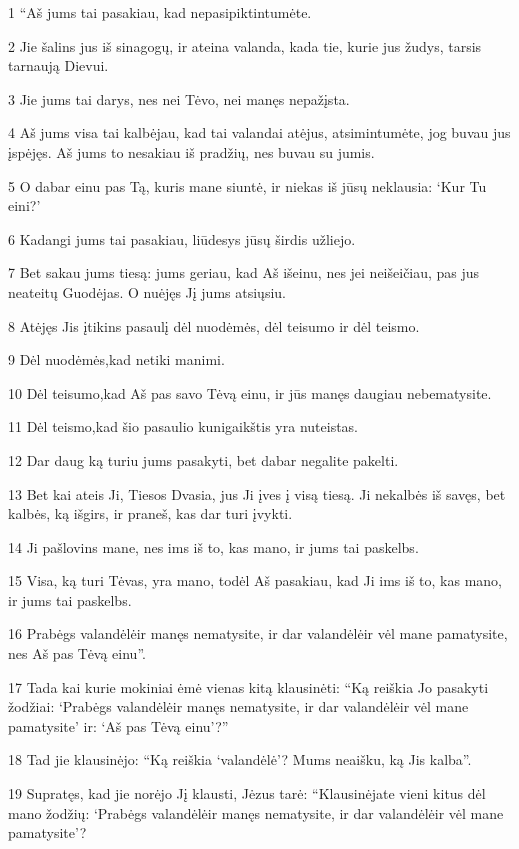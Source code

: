 \par 1 “Aš jums tai pasakiau, kad nepasipiktintumėte. 
\par 2 Jie šalins jus iš sinagogų, ir ateina valanda, kada tie, kurie jus žudys, tarsis tarnaują Dievui. 
\par 3 Jie jums tai darys, nes nei Tėvo, nei manęs nepažįsta. 
\par 4 Aš jums visa tai kalbėjau, kad tai valandai atėjus, atsimintumėte, jog buvau jus įspėjęs. Aš jums to nesakiau iš pradžių, nes buvau su jumis. 
\par 5 O dabar einu pas Tą, kuris mane siuntė, ir niekas iš jūsų neklausia: ‘Kur Tu eini?’ 
\par 6 Kadangi jums tai pasakiau, liūdesys jūsų širdis užliejo. 
\par 7 Bet sakau jums tiesą: jums geriau, kad Aš išeinu, nes jei neišeičiau, pas jus neateitų Guodėjas. O nuėjęs Jį jums atsiųsiu. 
\par 8 Atėjęs Jis įtikins pasaulį dėl nuodėmės, dėl teisumo ir dėl teismo. 
\par 9 Dėl nuodėmės,­kad netiki manimi. 
\par 10 Dėl teisumo,­kad Aš pas savo Tėvą einu, ir jūs manęs daugiau nebematysite. 
\par 11 Dėl teismo,­kad šio pasaulio kunigaikštis yra nuteistas. 
\par 12 Dar daug ką turiu jums pasakyti, bet dabar negalite pakelti. 
\par 13 Bet kai ateis Ji, Tiesos Dvasia, jus Ji įves į visą tiesą. Ji nekalbės iš savęs, bet kalbės, ką išgirs, ir praneš, kas dar turi įvykti. 
\par 14 Ji pašlovins mane, nes ims iš to, kas mano, ir jums tai paskelbs. 
\par 15 Visa, ką turi Tėvas, yra mano, todėl Aš pasakiau, kad Ji ims iš to, kas mano, ir jums tai paskelbs. 
\par 16 Prabėgs valandėlė­ir manęs nematysite, ir dar valandėlė­ir vėl mane pamatysite, nes Aš pas Tėvą einu”. 
\par 17 Tada kai kurie mokiniai ėmė vienas kitą klausinėti: “Ką reiškia Jo pasakyti žodžiai: ‘Prabėgs valandėlė­ir manęs nematysite, ir dar valandėlė­ir vėl mane pamatysite’ ir: ‘Aš pas Tėvą einu’?” 
\par 18 Tad jie klausinėjo: “Ką reiškia ‘valandėlė’? Mums neaišku, ką Jis kalba”. 
\par 19 Supratęs, kad jie norėjo Jį klausti, Jėzus tarė: “Klausinėjate vieni kitus dėl mano žodžių: ‘Prabėgs valandėlė­ir manęs nematysite, ir dar valandėlė­ir vėl mane pamatysite’? 

